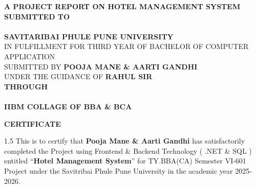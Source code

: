 \documentclass[12pt,a4paper]{article}
\begin{document}
\onehalfspacing
{}

\begin{titlepage}
\begin{center}
\vspace*{1cm}
{\Large \textbf{A PROJECT REPORT ON HOTEL MANAGEMENT SYSTEM}}\\[1.5cm]
{\large \textbf{SUBMITTED TO}}\\[1cm]
\fbox{\parbox{4cm}{\centering\vspace{0.5cm}{\large SPPU Logo}\vspace{0.5cm}}}\\[1cm]
{\Large \textbf{SAVITARIBAI PHULE PUNE UNIVERSITY}}\\[1cm]
{\large IN FULFILLMENT FOR THIRD YEAR OF BACHELOR OF COMPUTER APPLICATION}\\[0.5cm]
{\large SUBMITTED BY \textbf{POOJA MANE \& AARTI GANDHI}}\\[1cm]
{\large UNDER THE GUIDANCE OF \textbf{RAHUL SIR}}\\[1.5cm]
{\large \textbf{THROUGH}}\\[1cm]
\fbox{\parbox{5cm}{\centering\vspace{0.5cm}{\large IIBM College Logo}\vspace{0.5cm}}}\\[1cm]
{\large \textbf{IIBM COLLAGE OF BBA \& BCA}}
\end{center}
\end{titlepage}

\newpage
\begin{center}
\vspace{1.5cm}

{\Large \textbf{CERTIFICATE}}
\vspace{1cm}
\end{center}

\begin{spacing}{1.5}
\noindent This is to certify that \textbf{Pooja Mane \& Aarti Gandhi} has satisfactorily completed the Project using Frontend \& Backend Technology ( .NET \& SQL ) entitled ``\textbf{Hotel Management System}'' for TY.BBA(CA) Semester VI-601 Project under the Savitribai Phule Pune University in the academic year 2025-2026.
\end{spacing}
\end{document}
